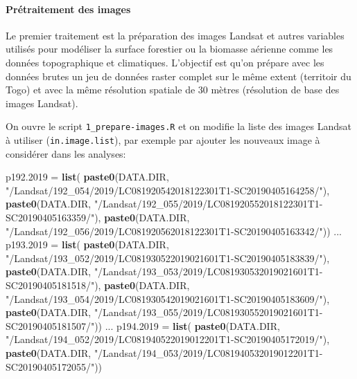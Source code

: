 \documentclass[a4paper, notitlepage, 12pt, krantz2]{krantz}
\newenvironment{Shaded}{\begin{snugshade}}{\end{snugshade}}
\newcommand{\FloatTok}[1]{\textcolor[rgb]{0.00,0.00,0.81}{#1}}
\newcommand{\KeywordTok}[1]{\textcolor[rgb]{0.13,0.29,0.53}{\textbf{#1}}}
\newcommand{\NormalTok}[1]{#1}
\newcommand{\StringTok}[1]{\textcolor[rgb]{0.31,0.60,0.02}{#1}}
\let\oldparagraph\paragraph
\renewcommand{\paragraph}[1]{\oldparagraph{#1}\mbox{}}
\begin{document}
\hypertarget{pretraitement-des-images}{%
\paragraph{Prétraitement des images}\label{pretraitement-des-images}}

Le premier traitement est la préparation des images Landsat et autres variables utilisés pour modéliser la surface forestier ou la biomasse aérienne comme les données topographique et climatiques. L'objectif est qu'on prépare avec les données brutes un jeu de données raster complet sur le même extent (territoir du Togo) et avec la même résolution spatiale de 30 mètres (résolution de base des images Landsat).

On ouvre le script \texttt{1\_prepare-images.R} et on modifie la liste des images Landsat à utiliser (\texttt{in.image.list}), par exemple par ajouter les nouveaux image à considérer dans les analyses:

\begin{Shaded}
\begin{Highlighting}[]
\NormalTok{p192}\FloatTok{.2019}\NormalTok{ =}\StringTok{ }\KeywordTok{list}\NormalTok{(}
  \KeywordTok{paste0}\NormalTok{(DATA.DIR, }\StringTok{"/Landsat/192_054/2019/LC081920542018122301T1-SC20190405164258/"}\NormalTok{),}
  \KeywordTok{paste0}\NormalTok{(DATA.DIR, }\StringTok{"/Landsat/192_055/2019/LC081920552018122301T1-SC20190405163359/"}\NormalTok{),}
  \KeywordTok{paste0}\NormalTok{(DATA.DIR, }\StringTok{"/Landsat/192_056/2019/LC081920562018122301T1-SC20190405163342/"}\NormalTok{))}
\NormalTok{...}
\NormalTok{p193}\FloatTok{.2019}\NormalTok{ =}\StringTok{ }\KeywordTok{list}\NormalTok{(}
  \KeywordTok{paste0}\NormalTok{(DATA.DIR, }\StringTok{"/Landsat/193_052/2019/LC081930522019021601T1-SC20190405183839/"}\NormalTok{),}
  \KeywordTok{paste0}\NormalTok{(DATA.DIR, }\StringTok{"/Landsat/193_053/2019/LC081930532019021601T1-SC20190405181518/"}\NormalTok{),}
  \KeywordTok{paste0}\NormalTok{(DATA.DIR, }\StringTok{"/Landsat/193_054/2019/LC081930542019021601T1-SC20190405183609/"}\NormalTok{),}
  \KeywordTok{paste0}\NormalTok{(DATA.DIR, }\StringTok{"/Landsat/193_055/2019/LC081930552019021601T1-SC20190405181507/"}\NormalTok{))}
\NormalTok{...}
\NormalTok{p194}\FloatTok{.2019}\NormalTok{ =}\StringTok{ }\KeywordTok{list}\NormalTok{(}
  \KeywordTok{paste0}\NormalTok{(DATA.DIR, }\StringTok{"/Landsat/194_052/2019/LC081940522019012201T1-SC20190405172019/"}\NormalTok{),}
  \KeywordTok{paste0}\NormalTok{(DATA.DIR, }\StringTok{"/Landsat/194_053/2019/LC081940532019012201T1-SC20190405172055/"}\NormalTok{))}
\end{Highlighting}
\end{Shaded}
\end{document}
